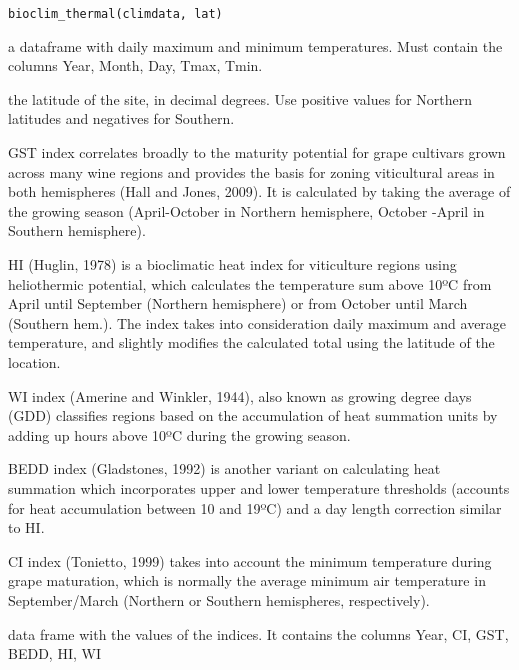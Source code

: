 \documentclass[a4paper]{book}
\begin{document}
%
\begin{Usage}
\begin{verbatim}
bioclim_thermal(climdata, lat)
\end{verbatim}
\end{Usage}
%
\begin{Arguments}
\begin{ldescription}
\item[\code{climdata}] a dataframe with daily maximum and minimum temperatures.
Must contain the columns Year, Month, Day, Tmax, Tmin.

\item[\code{lat}] the latitude of the site, in decimal degrees. Use positive values
for Northern latitudes and negatives for Southern.
\end{ldescription}
\end{Arguments}
%
\begin{Details}\relax
GST index correlates broadly to the maturity potential for grape cultivars 
grown across many wine regions and provides the basis for zoning viticultural
areas in both hemispheres (Hall and Jones, 2009). It is calculated by taking
the average of the growing season (April-October in Northern hemisphere, October
-April in Southern hemisphere).

HI (Huglin, 1978) is a bioclimatic heat index for viticulture regions using 
heliothermic potential, which calculates the temperature sum above 10ºC from 
April until September (Northern hemisphere) or from October until March (Southern
hem.). The index takes into consideration daily maximum and average temperature, 
and slightly modifies the calculated total using the latitude of the location.

WI index (Amerine and Winkler, 1944), also known as growing degree days (GDD) 
classifies regions based on the accumulation of heat summation units by adding up 
hours above 10ºC during the growing season.

BEDD index (Gladstones, 1992) is another variant on calculating heat summation 
which incorporates upper and lower temperature thresholds (accounts for heat 
accumulation between 10 and 19ºC) and a day length correction similar to HI.

CI index (Tonietto, 1999) takes into account the minimum temperature during 
grape maturation, which is normally the average minimum air temperature in 
September/March (Northern or Southern hemispheres, respectively).
\end{Details}
%
\begin{Value}
data frame with the values of the indices. It contains the columns
Year, CI, GST, BEDD, HI, WI
\end{Value}
\end{document}
